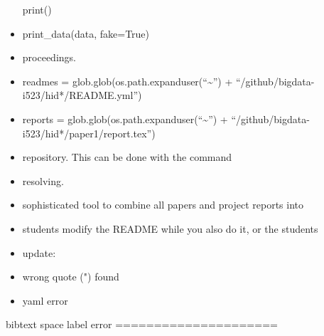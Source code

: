 \begin{itemize}
  print()
\item
  print\_data(data, fake=True)
\item
  proceedings.
\item
  readmes = glob.glob(os.path.expanduser(``\textasciitilde{}'') +
  ``/github/bigdata-i523/hid*/README.yml'')
\item
  reports = glob.glob(os.path.expanduser(``\textasciitilde{}'') +
  ``/github/bigdata-i523/hid*/paper1/report.tex'')
\item
  repository. This can be done with the command
\item
  resolving.
\item
  sophisticated tool to combine all papers and project reports into
\item
  students modify the README while you also do it, or the students
\item
  update:
\item
  wrong quote (") found
\item
  yaml error
\end{itemize}

bibtext space label error =====================

